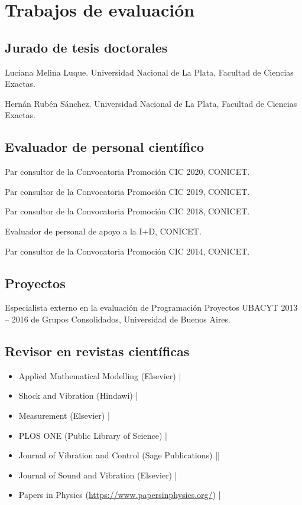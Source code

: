 \section{Trabajos de evaluación}

\subsection{Jurado de tesis doctorales}
 Luciana Melina Luque. Universidad Nacional de La Plata, Facultad de Ciencias Exactas.

 Hernán Rubén Sánchez. Universidad Nacional de La Plata, Facultad de Ciencias Exactas.

\subsection{Evaluador de personal científico}

 Par consultor de la Convocatoria Promoción CIC 2020, CONICET.

 Par consultor de la Convocatoria Promoción CIC 2019, CONICET.

 Par consultor de la Convocatoria Promoción CIC 2018, CONICET.

 Evaluador de personal de apoyo a la I+D, CONICET.

 Par consultor de la Convocatoria Promoción CIC 2014, CONICET.

\subsection{Proyectos}
 Especialista externo en la evaluación de Programación Proyectos UBACYT 2013 -- 2016 de Grupos Consolidados, Universidad de Buenos Aires.

\subsection{Revisor en revistas científicas}
\begin{itemize}
 \item Applied Mathematical Modelling (Elsevier) {\small \faCaretRight{}} |
 \item Shock and Vibration (Hindawi) {\small \faCaretRight{}} |
 \item Measurement (Elsevier) {\small \faCaretRight{}} |
 \item PLOS ONE (Public Library of Science) {\small \faCaretRight{}} |
 \item Journal of Vibration and Control (Sage Publications) {\small \faCaretRight{}}  ||
 \item Journal of Sound and Vibration (Elsevier) {\small \faCaretRight{}} \cancel{||||} |
 \item Papers in Physics (\url{https://www.papersinphysics.org/}) {\small \faCaretRight{}} |
\end{itemize}

